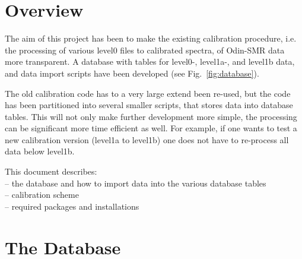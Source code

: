 \documentclass[12pt]{article}
\begin{document}
\tableofcontents
\thispagestyle{empty}
\newpage
\setcounter{page}{1}
\section{Overview}
The aim of this project has been to make the existing
calibration procedure, i.e. the processing of various
level0 files to calibrated spectra, of Odin-SMR data 
more transparent.
A database with tables for level0-, level1a-, and level1b data,
and data import scripts have been developed (see Fig.~\ref{fig:database}).

The old calibration code has to a very large extend been re-used,
but the code has been partitioned into several smaller scripts,
that stores data into database tables. This will not only make
further development more simple, the processing can be significant more
time efficient as well. For example, if one wants to test a new
calibration version (level1a to level1b) one does not have to
re-process all data below level1b.       

This document describes: \\
-- the database and how to import 
data into the various database tables\\
-- calibration scheme\\
-- required packages and installations\\

\clearpage
\newpage




\section{The Database}
\end{document}
